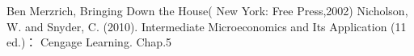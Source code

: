 \documentclass[10pt, a4paper]{ctexart} %
\begin{document}



\small
\begin{thebibliography}{99}
	\setlength{\parskip}{0pt} %
	   Ben Merzrich, Bringing Down the House( New York: Free Press,2002)
	 Nicholson, W. and Snyder, C. (2010). Intermediate Microeconomics and Its Application (11 ed.)： Cengage Learning. Chap.5
	\end {thebibliography}
\end{document}
